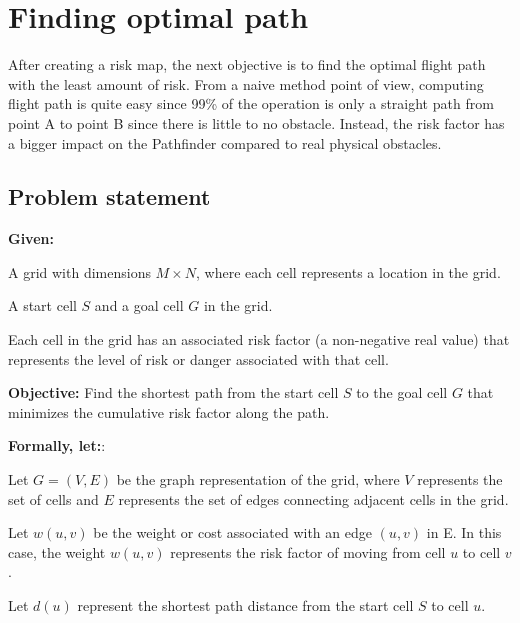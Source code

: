 \documentclass[12pt]{report}
\begin{document}
    \section{Finding optimal path}
        After creating a risk map, the next objective is to find the optimal flight path with the least amount of risk.
        From a naive method point of view, computing flight path is quite easy since 99\% of the operation is only a
        straight path from point A to point B since there is little to no obstacle. Instead, the risk factor has a
        bigger impact on the Pathfinder compared to real physical obstacles.

        \pagebreak
        \subsection{Problem statement}
        \textbf{Given:}
        \begin{myitemize}
            \item A grid with dimensions \(M \times N\), where each cell represents a location in the grid.
            \item A start cell \(S\) and a goal cell \(G\) in the grid. 
            \item Each cell in the grid has an associated risk factor (a non-negative real value) that represents the
            level of risk or danger associated with that cell.
        \end{myitemize}

        \textbf{Objective:} Find the shortest path from the start cell \(S\) to the goal cell \(G\) that minimizes the
        cumulative risk factor along the path.
        
        \textbf{Formally, let:}:
        \begin{myitemize}
            \item Let \(G = (V, E)\)  be the graph representation of the grid, where \(V\) represents the set of cells
            and \(E\) represents the set of edges connecting adjacent cells in the grid.
            \item Let \(w(u, v)\) be the weight or cost associated with an edge \((u, v)\) in E. In this case, the
            weight \(w(u, v)\)  represents the risk factor of moving from cell \(u\) to cell \(v\).
            \item Let \(d(u)\) represent the shortest path distance from the start cell \(S\) to cell \(u\).
        \end{myitemize}
\end{document}
